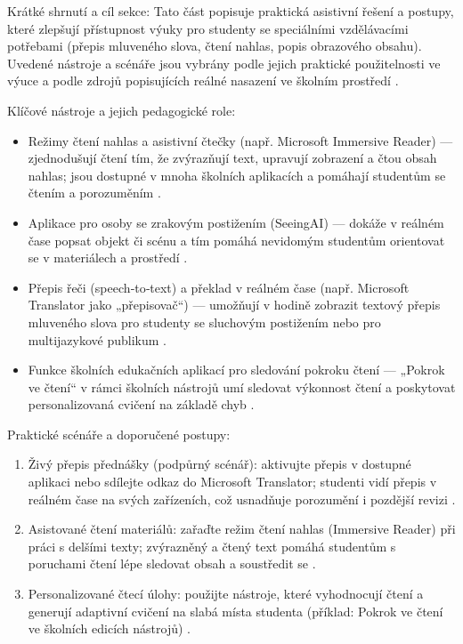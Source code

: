 \begin{flushleft}
Krátké shrnutí a cíl sekce: Tato část popisuje praktická asistivní řešení a postupy, které zlepšují přístupnost výuky pro studenty se speciálními vzdělávacími potřebami (přepis mluveného slova, čtení nahlas, popis obrazového obsahu). Uvedené nástroje a scénáře jsou vybrány podle jejich praktické použitelnosti ve výuce a podle zdrojů popisujících reálné nasazení ve školním prostředí \cite{kb_ai_101_tipu_pdf_04e4a115_page_11_1,kb_ai_101_tipu_pdf_04e4a115_page_7_1}.
\end{flushleft}

\bigskip

Klíčové nástroje a jejich pedagogické role:
\begin{itemize}
  \item Režimy čtení nahlas a asistivní čtečky (např. Microsoft Immersive Reader) — zjednodušují čtení tím, že zvýrazňují text, upravují zobrazení a čtou obsah nahlas; jsou dostupné v mnoha školních aplikacích a pomáhají studentům se čtením a porozuměním \cite{kb_ai_101_tipu_pdf_04e4a115_page_11_1}.
  \item Aplikace pro osoby se zrakovým postižením (SeeingAI) — dokáže v reálném čase popsat objekt či scénu a tím pomáhá nevidomým studentům orientovat se v materiálech a prostředí \cite{kb_ai_101_tipu_pdf_04e4a115_page_11_1}.
  \item Přepis řeči (speech‑to‑text) a překlad v reálném čase (např. Microsoft Translator jako „přepisovač“) — umožňují v hodině zobrazit textový přepis mluveného slova pro studenty se sluchovým postižením nebo pro multijazykové publikum \cite{kb_ai_101_tipu_pdf_04e4a115_page_11_1}.
  \item Funkce školních edukačních aplikací pro sledování pokroku čtení — „Pokrok ve čtení“ v rámci školních nástrojů umí sledovat výkonnost čtení a poskytovat personalizovaná cvičení na základě chyb \cite{kb_ai_101_tipu_pdf_04e4a115_page_7_1}.
\end{itemize}

Praktické scénáře a doporučené postupy:
\begin{enumerate}
  \item Živý přepis přednášky (podpůrný scénář): aktivujte přepis v dostupné aplikaci nebo sdílejte odkaz do Microsoft Translator; studenti vidí přepis v reálném čase na svých zařízeních, což usnadňuje porozumění i pozdější revizi \cite{kb_ai_101_tipu_pdf_04e4a115_page_11_1}.
  \item Asistované čtení materiálů: zařaďte režim čtení nahlas (Immersive Reader) při práci s delšími texty; zvýrazněný a čtený text pomáhá studentům s poruchami čtení lépe sledovat obsah a soustředit se \cite{kb_ai_101_tipu_pdf_04e4a115_page_11_1}.
  \item Personalizované čtecí úlohy: použijte nástroje, které vyhodnocují čtení a generují adaptivní cvičení na slabá místa studenta (příklad: Pokrok ve čtení ve školních edicích nástrojů) \cite{kb_ai_101_tipu_pdf_04e4a115_page_7_1}.
\end{enumerate}

